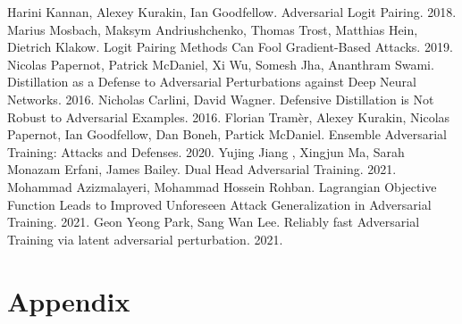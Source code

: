 \documentclass[conference]{IEEEtran}
\begin{document}
\begin{thebibliography}{00}
   Harini Kannan, Alexey Kurakin, Ian Goodfellow. Adversarial Logit Pairing. 2018.
   Marius Mosbach, Maksym Andriushchenko, Thomas Trost, Matthias Hein, Dietrich Klakow. Logit Pairing Methods Can Fool Gradient-Based Attacks. 2019.
   Nicolas Papernot, Patrick McDaniel, Xi Wu, Somesh Jha, Ananthram Swami. Distillation as a Defense to Adversarial Perturbations against Deep Neural Networks. 2016.
   Nicholas Carlini, David Wagner. Defensive Distillation is Not Robust to Adversarial Examples. 2016.
   Florian Tramèr, Alexey Kurakin, Nicolas Papernot, Ian Goodfellow, Dan Boneh, Partick McDaniel. Ensemble Adversarial Training: Attacks and Defenses. 2020.
   Yujing Jiang , Xingjun Ma, Sarah Monazam Erfani, James Bailey. Dual Head Adversarial Training. 2021.
   Mohammad Azizmalayeri, Mohammad Hossein Rohban. Lagrangian Objective Function Leads to Improved Unforeseen Attack Generalization in Adversarial Training. 2021.
   Geon Yeong Park, Sang Wan Lee. Reliably fast Adversarial Training via latent adversarial perturbation. 2021.

\end{thebibliography}

\newpage

\section{Appendix}
\end{document}
